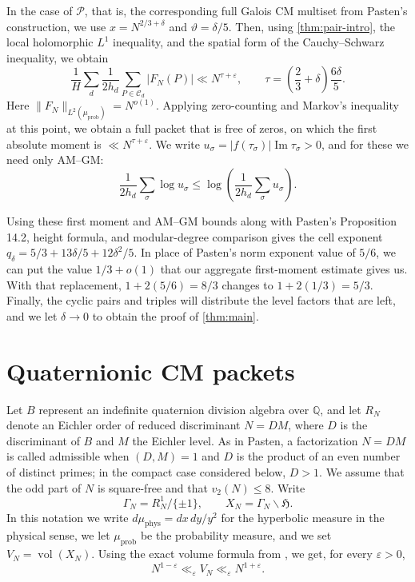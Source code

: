 \documentclass[11pt,reqno]{amsart}
\theoremstyle{definition}
\newcommand{\Q}{\mathbb Q}
\newcommand{\Hh}{\mathfrak H}
\newcommand{\vol}{\operatorname{vol}}
\newcommand{\eps}{\varepsilon}
\begin{document}
In the case of $\mathscr P$, that is, the corresponding full Galois CM
multiset from Pasten's construction, we use $x=N^{2/3+\delta}$ and
$\vartheta=\delta/5$. Then, using \cref{thm:pair-intro}, the local holomorphic $L^1$ inequality,
and the spatial form of the Cauchy--Schwarz inequality, we obtain \[
 \frac1H\sum_d\frac1{2h_d}
 \sum_{P\in\mathscr C_d}|F_N(P)|
 \ll N^{\tau+\eps},
 \qquad
 \tau=\left(\frac23+\delta\right)\frac{6\delta}{5}.
\]
Here $\|F_N\|_{L^2(\mu_{\mathrm{prob}})}=N^{o(1)}$. Applying zero-counting and Markov's inequality at this point, we obtain a full
packet that is free of zeros, on which the first absolute moment is
$\ll N^{\tau+\eps}$. We write $u_\sigma=|f(\tau_\sigma)|\operatorname{Im}\tau_\sigma>0$, and for these we need only AM--GM:
\[
 \frac1{2h_d}\sum_\sigma\log u_\sigma
 \leq \log\left(\frac1{2h_d}\sum_\sigma u_\sigma\right).
\]

Using these first moment and AM--GM bounds along with Pasten's Proposition
14.2, height formula, and modular-degree comparison gives the cell exponent
$q_\delta=5/3+13\delta/5+12\delta^2/5$. In place of Pasten's norm exponent value of $5/6$, we can put the value
$1/3+o(1)$ that our aggregate first-moment estimate gives us. With that replacement, $1+2(5/6)=8/3$ changes to $1+2(1/3)=5/3$. Finally, the cyclic pairs and triples will distribute the level factors that
are left, and we let $\delta\to0$ to obtain the proof of
\cref{thm:main}.

\section{Quaternionic CM packets}\label{sec:setup}

Let $B$ represent an indefinite quaternion division algebra over $\Q$, and let $R_N$ denote an Eichler order of reduced discriminant $N=DM$, where $D$ is the discriminant of $B$ and $M$ the Eichler level. As in Pasten, a factorization $N=DM$ is called admissible when $(D,M)=1$ and $D$ is the product of an even number of distinct primes; in the compact case considered below, $D>1$. We assume that the odd part of $N$ is square-free and that $v_2(N)\leq8$. Write
\[
 \Gamma_N=R_N^1/\{\pm1\},\qquad X_N=\Gamma_N\backslash\Hh.
\]
In this notation we write $d\mu_{\mathrm{phys}}=dx\,dy/y^2$ for the
hyperbolic measure in the physical sense, we let $\mu_{\mathrm{prob}}$ be
the probability measure, and we set $V_N=\vol(X_N)$. Using the exact volume formula from \cite[Equation (2.7)]{BruinierLiMoller},
we get, for every $\eps>0$, \[ N^{1-\eps}\ll_\eps V_N\ll_\eps N^{1+\eps}.
\]
\end{document}
